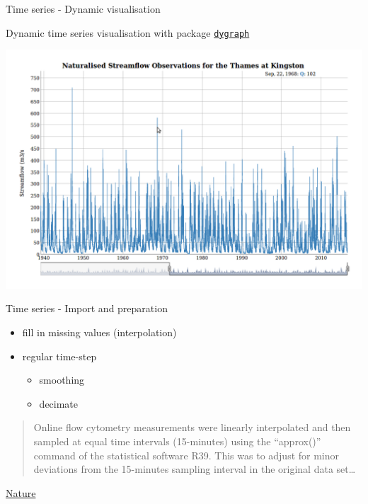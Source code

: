 \documentclass[8pt,ignorenonframetext,]{beamer}
\providecommand{\tightlist}{%
  \setlength{\itemsep}{0pt}\setlength{\parskip}{0pt}}
\begin{document}
\begin{frame}[fragile]{Time series - Dynamic visualisation}

Dynamic time series visualisation with package
\href{https://cran.r-project.org/web/packages/dygraph/index.html}{\texttt{dygraph}}

\includegraphics{imgPres/dygraph.png}

\end{frame}

\begin{frame}{Time series - Import and preparation}

\begin{itemize}
\tightlist
\item
  fill in missing values (interpolation)
\item
  regular time-step

  \begin{itemize}
  \tightlist
  \item
    smoothing
  \item
    decimate
  \end{itemize}
\end{itemize}

\begin{quote}
Online flow cytometry measurements were linearly interpolated and then
sampled at equal time intervals (15-minutes) using the ``approx()''
command of the statistical software R39. This was to adjust for minor
deviations from the 15-minutes sampling interval in the original data
set\ldots{}
\end{quote}

\href{https://www.nature.com/articles/srep38462}{Nature}

\end{frame}
\end{document}
